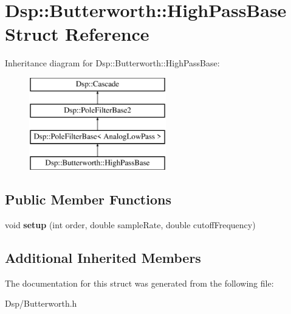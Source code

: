 \hypertarget{structDsp_1_1Butterworth_1_1HighPassBase}{\section{Dsp\-:\-:Butterworth\-:\-:High\-Pass\-Base Struct Reference}
\label{structDsp_1_1Butterworth_1_1HighPassBase}
}
Inheritance diagram for Dsp\-:\-:Butterworth\-:\-:High\-Pass\-Base\-:\begin{figure}[H]
\begin{center}
\leavevmode
\includegraphics[height=4.000000cm]{structDsp_1_1Butterworth_1_1HighPassBase}
\end{center}
\end{figure}
\subsection*{Public Member Functions}
\begin{DoxyCompactItemize}
\item 
\hypertarget{structDsp_1_1Butterworth_1_1HighPassBase_a41f5a9f4f1fdbaf9a1807447970f74cc}{void {\bfseries setup} (int order, double sample\-Rate, double cutoff\-Frequency)}\label{structDsp_1_1Butterworth_1_1HighPassBase_a41f5a9f4f1fdbaf9a1807447970f74cc}

\end{DoxyCompactItemize}
\subsection*{Additional Inherited Members}


The documentation for this struct was generated from the following file\-:\begin{DoxyCompactItemize}
\item 
Dsp/Butterworth.\-h\end{DoxyCompactItemize}
